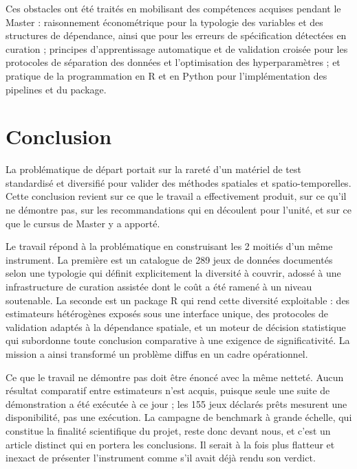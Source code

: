 \documentclass[11pt,a4paper]{article}
\begin{document}
Ces obstacles ont été traités en mobilisant des compétences acquises pendant le Master : raisonnement économétrique pour la typologie des variables et des structures de dépendance, ainsi que pour les erreurs de spécification détectées en curation ; principes d'apprentissage automatique et de validation croisée pour les protocoles de séparation des données et l'optimisation des hyperparamètres ; et pratique de la programmation en R et en Python pour l'implémentation des pipelines et du package.

\section{Conclusion}

La problématique de départ portait sur la rareté d'un matériel de test standardisé et diversifié pour valider des méthodes spatiales et spatio-temporelles. Cette conclusion revient sur ce que le travail a effectivement produit, sur ce qu'il ne démontre pas, sur les recommandations qui en découlent pour l'unité, et sur ce que le cursus de Master y a apporté.

Le travail répond à la problématique en construisant les 2 moitiés d'un même instrument. La première est un catalogue de 289 jeux de données documentés selon une typologie qui définit explicitement la diversité à couvrir, adossé à une infrastructure de curation assistée dont le coût a été ramené à un niveau soutenable. La seconde est un package R qui rend cette diversité exploitable : des estimateurs hétérogènes exposés sous une interface unique, des protocoles de validation adaptés à la dépendance spatiale, et un moteur de décision statistique qui subordonne toute conclusion comparative à une exigence de significativité. La mission a ainsi transformé un problème diffus en un cadre opérationnel.

Ce que le travail ne démontre pas doit être énoncé avec la même netteté. Aucun résultat comparatif entre estimateurs n'est acquis, puisque seule une suite de démonstration a été exécutée à ce jour ; les 155 jeux déclarés prêts mesurent une disponibilité, pas une exécution. La campagne de benchmark à grande échelle, qui constitue la finalité scientifique du projet, reste donc devant nous, et c'est un article distinct qui en portera les conclusions. Il serait à la fois plus flatteur et inexact de présenter l'instrument comme s'il avait déjà rendu son verdict.
\end{document}
